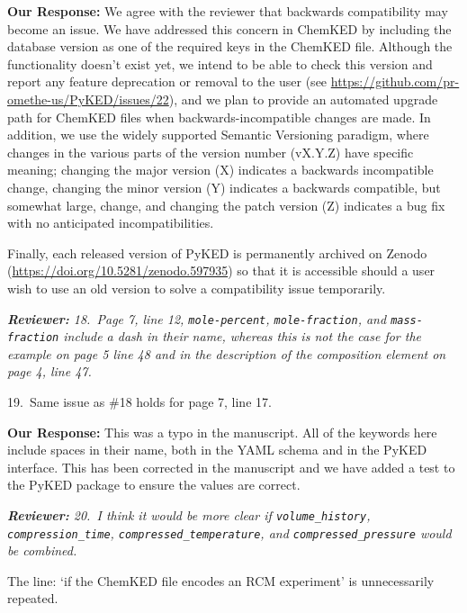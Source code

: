 \documentclass[a4paper,10pt]{elsarticle}
\newenvironment{reviewer}{\vspace{0.5\baselineskip}\begingroup\itshape\textbf{Reviewer:}}{\endgroup}
\newenvironment{response}{\textbf{Our Response:}}{\vspace{0.5\baselineskip}}
\begin{document}
\begin{response}
    We agree with the reviewer that backwards compatibility may become an issue. We have addressed
    this concern in ChemKED by including the database version as one of the required keys in the
    ChemKED file. Although the functionality doesn't exist yet, we intend to be able to check this
    version and report any feature deprecation or removal to the user (see
    \url{https://github.com/pr-omethe-us/PyKED/issues/22}), and we plan to provide an automated
    upgrade path for ChemKED files when backwards-incompatible changes are made. In addition, we use
    the widely supported Semantic Versioning paradigm, where changes in the various parts of the
    version number (vX.Y.Z) have specific meaning; changing the major version (X) indicates a
    backwards incompatible change, changing the minor version (Y) indicates a backwards compatible,
    but somewhat large, change, and changing the patch version (Z) indicates a bug fix with no
    anticipated incompatibilities.

    Finally, each released version of PyKED is permanently archived on Zenodo
    (\url{https://doi.org/10.5281/zenodo.597935}) so that it is accessible should a user wish to use
    an old version to solve a compatibility issue temporarily.
\end{response}

\begin{reviewer}
    18.~Page 7, line 12, \texttt{mole-percent}, \texttt{mole-fraction}, and \texttt{mass-fraction}
    include a dash in their name, whereas this is not the case for the example on page 5 line 48 and
    in the description of the composition element on page 4, line 47.

    19.~Same issue as \#18 holds for page 7, line 17.
\end{reviewer}

\begin{response}
    This was a typo in the manuscript. All of the keywords here include spaces in their name, both
    in the YAML schema and in the PyKED interface. This has been corrected in the manuscript and we
    have added a test to the PyKED package to ensure the values are correct.
\end{response}

\begin{reviewer}
    20.~I think it would be more clear if \texttt{volume\_history}, \texttt{compression\_time},
    \texttt{compressed\_temperature}, and \texttt{compressed\_pressure} would be combined.

    The line: `if the ChemKED file encodes an RCM experiment' is unnecessarily repeated.
\end{reviewer}
\end{document}

